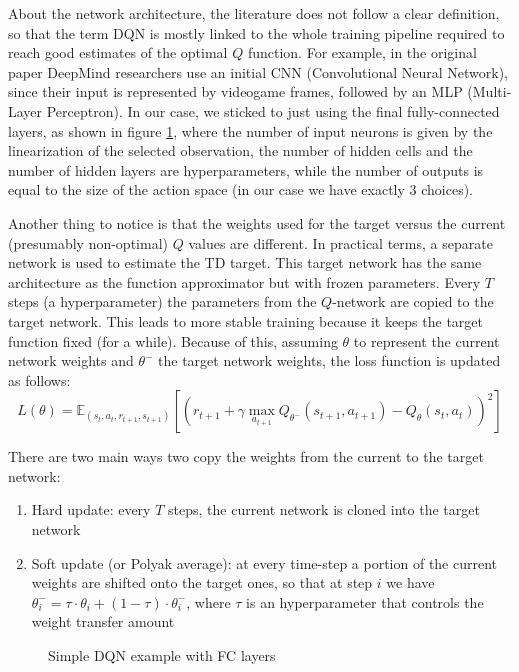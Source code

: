 \documentclass[a4paper,10pt]{report}
\begin{document}
About the network architecture, the literature does not follow a clear definition, so that the term DQN is mostly linked to the whole training pipeline required to reach good estimates of the optimal $Q$ function. For example, in the original paper \cite{atari-dqn} DeepMind researchers use an initial CNN (Convolutional Neural Network), since their input is represented by videogame frames, followed by an MLP (Multi-Layer Perceptron). In our case, we sticked to just using the final fully-connected layers, as shown in figure \ref{fig:fc-dqn}, where the number of input neurons is given by the linearization of the selected observation, the number of hidden cells and the number of hidden layers are hyperparameters, while the number of outputs is equal to the size of the action space (in our case we have exactly $3$ choices). 

Another thing to notice is that the weights used for the target versus the current (presumably non-optimal) $Q$ values are different. In practical terms, a separate network is used to estimate the TD target. This target network has the same architecture as the function approximator but with frozen parameters. Every $T$ steps (a hyperparameter) the parameters from the $Q$-network are copied to the target network. This leads to more stable training because it keeps the target function fixed (for a while). Because of this, assuming $\theta$ to represent the current network weights and $\theta^{-}$ the target network weights, the loss function is updated as follows:
$$
L(\theta)=\mathbb{E}_{(s_t,a_t,r_{t+1},s_{t+1})}\left[\left(r_{t+1}+\gamma\max_{a_{t+1}}Q_{\theta^{-}}(s_{t+1}, a_{t+1}) - Q_{\theta}(s_t, a_t)\right)^2\right]
$$

There are two main ways two copy the weights from the current to the target network:
\begin{enumerate}
	\item Hard update: every $T$ steps, the current network is cloned into the target network
	\item Soft update (or Polyak average): at every time-step a portion of the current weights are shifted onto the target ones, so that at step $i$ we have $\theta_i^{-}=\tau \cdot \theta_i + (1-\tau)\cdot \theta_i^{-}$, where $\tau$ is an hyperparameter that controls the weight transfer amount 
\end{enumerate}

\begin{figure}[h]
	\centering
	
	\caption{Simple DQN example with FC layers}
	\label{fig:fc-dqn}
\end{figure}
\end{document}
